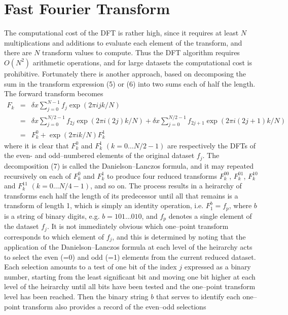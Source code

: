 \documentclass[dvips]{article}
\begin{document}
\section*{Fast Fourier Transform}
The computational cost of the DFT is rather high, since it requires at
least $N$ multiplications and additions to evaluate each element of the
transform, and there are $N$ transform values to compute.  Thus 
the DFT algorithm requires $O(N^{2})$ arithmetic operations, and for large
datasets the computational cost is prohibitive.  Fortunately there is another
approach, based on decomposing the sum in the transform expression (5)
or (6) into two sums each of half the length.  The forward transform becomes
\begin{eqnarray}
F_{k} & = & \delta x\sum_{j=0}^{N-1} f_{j} \exp{(2\pi ijk/N)} \nonumber \\
& = & \delta x\sum_{j=0}^{N/2-1} f_{2j} \exp{(2\pi i(2j)k/N)} 
+     \delta x\sum_{j=0}^{N/2-1} f_{2j+1} \exp{(2\pi i(2j+1)k/N)} \nonumber \\
& = & F^{0}_{k} + \exp{(2\pi i k/N)}F^{1}_{k}
\end{eqnarray}
where it is clear that $F^{0}_{k}$ and $F^{1}_{k}$ $(k=0\ldots
N/2-1)$ are respectively the DFTs of the even- and odd--numbered elements
of the original dataset $f_{j}$.
The decomposition (7) is called the Danielson--Lanczos formula, and it may
repeated recursively on each of $F^{0}_{k}$ and $F^{1}_{k}$
to produce four reduced transforms $F^{00}_{k}$, $F^{01}_{k}$,
$F^{10}_{k}$ and $F^{11}_{k}$ $(k=0\ldots N/4-1)$, and so on.
The process results in a heirarchy of transforms each half the length of
its predecessor until all
that remains is a transform of length 1, which is
simply an identity operation, i.e. $F^{b}_{1} = f_{p}$,
where $b$ is a string of binary digits, e.g. $b = 101\ldots 010$,
and $f_{p}$ denotes a single element of the dataset $f_{j}$.
It is not immediately obvious which one--point transform corresponds to
which element of $f_{j}$, and this is determined by noting that the
application of the Danielson--Lanczos formula at each level of the
heirarchy acts to select the even (=0) and odd (=1) elements from the
current reduced dataset.  Each selection amounts to a test of one bit
of the index $j$ expressed as a binary number, starting from the
least significant bit and moving one bit higher at each level of the
heirarchy until all bits have been tested and the one--point transform
level has been reached.  Then
the binary string $b$ that serves to identify each
one--point transform also provides a record of the even--odd selections
\end{document}
